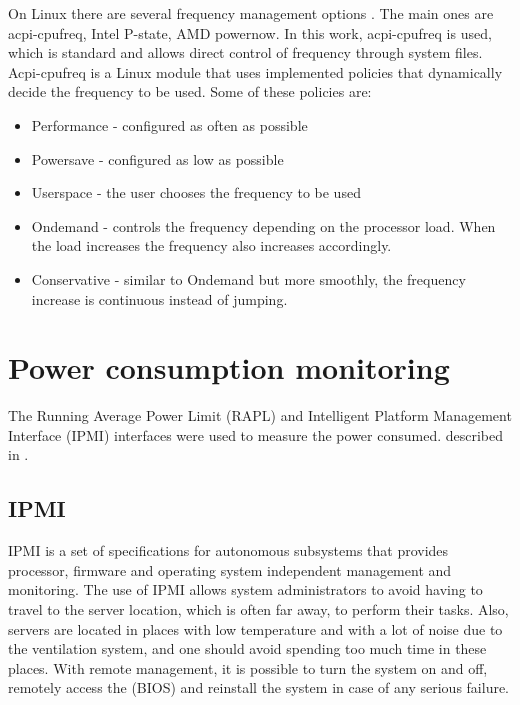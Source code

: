 On Linux there are several frequency management options \cite {Brown2005ACPILinux}. The main ones are acpi-cpufreq, Intel P-state, AMD powernow. In this work, acpi-cpufreq is used, which is standard and allows direct control of frequency through system files. Acpi-cpufreq is a Linux module that uses implemented policies that dynamically decide the frequency to be used. Some of these policies are:

\begin{itemize}
\item Performance - configured as often as possible
\item Powersave - configured as low as possible
\item Userspace - the user chooses the frequency to be used
\item Ondemand - controls the frequency depending on the processor load. When the load increases the frequency also increases accordingly.
\item Conservative - similar to Ondemand but more smoothly, the frequency increase is continuous instead of jumping.
\end{itemize}

\section{Power consumption monitoring} \label{sec:power_consumption_monitoring}
The Running Average Power Limit (RAPL) and Intelligent Platform Management Interface (IPMI) interfaces were used to measure the power consumed. described in \cite{IPMI2013ConfigurationGuide}.

\subsection{IPMI}
IPMI \cite{IPMI2013ConfigurationGuide} is a set of specifications for autonomous subsystems that provides processor, firmware and operating system independent management and monitoring. The use of IPMI allows system administrators to avoid having to travel to the server location, which is often far away, to perform their tasks. Also, servers are located in places with low temperature and with a lot of noise due to the ventilation system, and one should avoid spending too much time in these places. With remote management, it is possible to turn the system on and off, remotely access the (BIOS) and reinstall the system in case of any serious failure.

